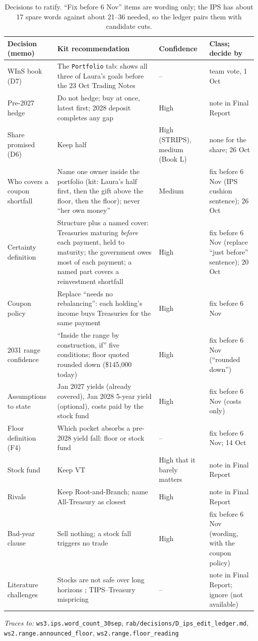 \documentclass[11pt,a4paper]{article}
\newcommand{\nk}[1]{{\urlstyle{tt}\nolinkurl{#1}}}
\newcommand{\src}[1]{{\urlstyle{tt}\nolinkurl{#1}}}
\newcommand{\keys}[1]{\par{\footnotesize\raggedright\color{black!60}\textit{Traces to:} #1\par}}
\begin{document}
\begin{table}[h]
\centering\small
\begin{tabularx}{\textwidth}{>{\raggedright}p{2.8cm}>{\raggedright}X>{\raggedright}p{1.75cm}>{\raggedright\arraybackslash}p{3.0cm}}
\toprule
Decision (memo) & Kit recommendation & Confidence & Class; decide by \\
\midrule
WInS book (D7) & The \texttt{Portfolio} tab: shows all three of Laura's goals before the 23 Oct Trading Notes & -- & team vote, 1 Oct \\
Pre-2027 hedge & Do not hedge; buy at once, latest first; 2028 deposit completes any gap & High & note in Final Report \\
Share promised (D6) & Keep half & High (STRIPS), medium (Book L) & none for the share; 26 Oct \\
Who covers a coupon shortfall & Name one owner inside the portfolio (kit: Laura's half first, then the gift above the floor, then the floor); never ``her own money'' & Medium & fix before 6 Nov (IPS cushion sentence); 26 Oct \\
Certainty definition & Structure plus a named cover: Treasuries maturing \emph{before} each payment, held to maturity; the government owes most of each payment; a named part covers a reinvestment shortfall & High & fix before 6 Nov (replace ``just before'' sentence); 20 Oct \\
Coupon policy & Replace ``needs no rebalancing'': each holding's income buys Treasuries for the same payment & High & fix before 6 Nov \\
2031 range confidence & ``Inside the range by construction, if'' five conditions; floor quoted rounded down (\$145,000 today) & High & fix before 6 Nov (``rounded down'') \\
Assumptions to state & Jan 2027 yields (already covered), Jan 2028 5-year yield (optional), costs paid by the stock fund & High & fix before 6 Nov (costs only) \\
Floor definition (F4) & Which pocket absorbs a pre-2028 yield fall: floor or stock fund & -- & fix before 6 Nov; 14 Oct \\
Stock fund & Keep VT & High that it barely matters & note in Final Report \\
Rivals & Keep Root-and-Branch; name All-Treasury as closest & High & note in Final Report \\
Bad-year clause & Sell nothing; a stock fall triggers no trade & High & fix before 6 Nov (wording, with the coupon policy) \\
Literature challenges & Stocks are not safe over long horizons \citep{anarkulova2022stocks,bodie1995risk}; TIPS--Treasury mispricing \citep{fleckenstein2014tips} & -- & note in Final Report; ignore (not available) \\
\bottomrule
\end{tabularx}
\caption{Decisions to ratify. ``Fix before 6 Nov'' items are wording only; the IPS has about 17 spare words against
about 21--36 needed, so the ledger pairs them with candidate cuts.}
\label{tab:decisions}
\end{table}
\keys{\nk{ws3.ips.word_count_30sep}, \src{rab/decisions/D_ips_edit_ledger.md}, \nk{ws2.range.announced_floor}, \nk{ws2.range.floor_reading}}
\end{document}

